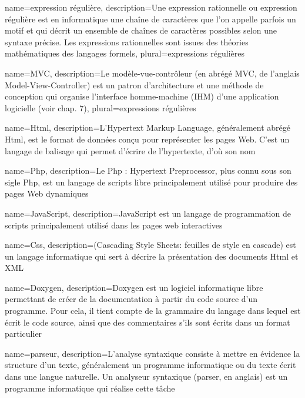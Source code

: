 \documentclass[a4paper, 12pt]{report}
\begin{document}
	{
		name={expression régulière},
		description={Une expression rationnelle ou expression régulière est en informatique une chaîne de caractères que l’on appelle parfois un motif
		et qui décrit un ensemble de chaînes de caractères possibles selon une syntaxe précise.
		Les expressions rationnelles sont issues des théories mathématiques des langages formels},
		plural={expressions régulières}
	}

	{
		name={MVC},
		description={Le modèle-vue-contrôleur (en abrégé MVC, de l'anglais Model-View-Controller) est un patron d'architecture et une méthode de conception qui organise l'interface homme-machine (IHM) d'une application logicielle (voir chap. 7)},
		plural={expressions régulières}
	}

	{
		name={Html},
		description={L’Hypertext Markup Language, généralement abrégé Html, est le format de données conçu pour représenter les pages Web. C’est un langage de balisage qui permet d’écrire de l’hypertexte, d’où son nom}
	}

	{
		name={Php},
		description={Le Php : Hypertext Preprocessor, plus connu sous son sigle Php, est un langage de scripts libre principalement utilisé pour
		produire des pages Web dynamiques}
	}

	{
		name={JavaScript},
		description={JavaScript est un langage de programmation de scripts principalement utilisé dans les pages web interactives}
	}

	{
		name={Css},
		description={(Cascading Style Sheets: feuilles de style en cascade) est un langage informatique qui sert à décrire la présentation
		des documents Html et XML}
	}

	{
		name={Doxygen},
		description={Doxygen est un logiciel informatique libre permettant de créer de la documentation à partir du code source d'un programme.
		Pour cela, il tient compte de la grammaire du langage dans lequel est écrit le code source, ainsi que des commentaires s'ils sont écrits
		dans un format particulier}
	}

	{
		name={parseur},
		description={L'analyse syntaxique consiste à mettre en évidence la structure d'un texte, généralement un programme informatique ou du texte
		écrit dans une langue naturelle. Un analyseur syntaxique (parser, en anglais) est un programme informatique qui réalise cette tâche}
	}
\end{document}
